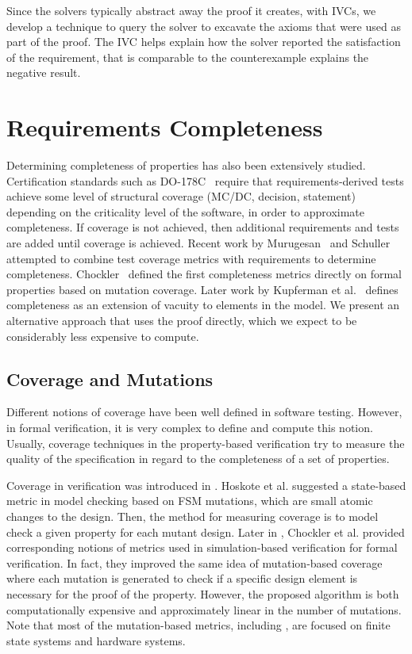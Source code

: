 Since the solvers typically abstract away the proof it creates, with IVCs, we develop a technique to query the solver to excavate the axioms that were used as part of the proof. The IVC helps explain how the solver reported the satisfaction of the requirement, that is comparable to the counterexample explains the negative result.


\section{Requirements Completeness}
Determining completeness of properties has also been extensively studied. Certification standards such as DO-178C~\cite{DO178C} require that requirements-derived tests achieve some level of structural coverage (MC/DC, decision, statement) depending on the criticality level of the software, in order to approximate completeness.  If coverage is not achieved, then additional requirements and tests are added until coverage is achieved. Recent work by Murugesan~\cite{murugesan2015we} and Schuller~\cite{schuler_assessing_2011} attempted to combine test coverage metrics with requirements to determine completeness.  Chockler~\cite{chockler_coverage_2003} defined the first completeness metrics directly on formal properties based on mutation coverage.  Later work by Kupferman et al.~\cite{Kupferman:2006:SCF} defines completeness as an extension of vacuity to elements in the model.  We present an alternative approach that uses the proof directly, which we expect to be considerably less expensive to compute.


\subsection{Coverage and Mutations}

Different notions of coverage have been well defined in software testing. However, in formal verification, it is very complex to define and compute this notion.
Usually, coverage techniques in the property-based verification try to measure the quality of the specification in regard to the completeness of a set of properties.

Coverage in verification was introduced in \cite{hoskote1999coverage, katz1999have}. Hoskote et al. \cite{hoskote1999coverage} suggested a state-based metric in model checking based on FSM mutations, which are small atomic changes to the design. Then, the method for measuring coverage is to model check a given property for each mutant design.
Later in \cite{chockler_coverage_2003}, Chockler et al. provided corresponding notions of metrics used in simulation-based verification for formal verification. In fact, they improved the same idea of mutation-based coverage where each mutation is generated to check if a specific
design element is necessary for the proof of the property.
 However, the proposed algorithm is both computationally expensive and approximately linear
 in the number of mutations. Note that most of the mutation-based metrics, including \cite{kupferman_theory_2008, chockler2001practical}, are focused on finite state systems and hardware systems.

